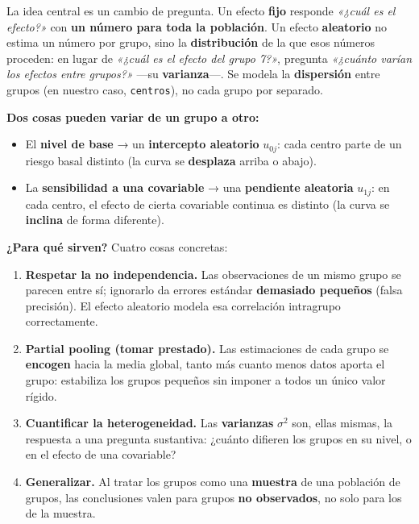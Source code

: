 \documentclass[
  letterpaper,
  DIV=11,
  numbers=noendperiod]{scrartcl}
\providecommand{\tightlist}{%
  \setlength{\itemsep}{0pt}\setlength{\parskip}{0pt}}\usepackage{longtable,booktabs,array}
\begin{document}
La idea central es un cambio de pregunta. Un efecto \textbf{fijo}
responde \emph{«¿cuál es el efecto?»} con \textbf{un número para toda la
población}. Un efecto \textbf{aleatorio} no estima un número por grupo,
sino la \textbf{distribución} de la que esos números proceden: en lugar
de \emph{«¿cuál es el efecto del grupo 7?»}, pregunta \emph{«¿cuánto
varían los efectos entre grupos?»} ---su \textbf{varianza}---. Se modela
la \textbf{dispersión} entre grupos (en nuestro caso, \texttt{centros}),
no cada grupo por separado.

\textbf{Dos cosas pueden variar de un grupo a otro:}

\begin{itemize}
\tightlist
\item
  El \textbf{nivel de base} → un \textbf{intercepto aleatorio}
  \(u_{0j}\): cada centro parte de un riesgo basal distinto (la curva se
  \textbf{desplaza} arriba o abajo).
\item
  La \textbf{sensibilidad a una covariable} → una \textbf{pendiente
  aleatoria} \(u_{1j}\): en cada centro, el efecto de cierta covariable
  continua es distinto (la curva se \textbf{inclina} de forma
  diferente).
\end{itemize}

\textbf{¿Para qué sirven?} Cuatro cosas concretas:

\begin{enumerate}
\def\labelenumi{\arabic{enumi}.}
\tightlist
\item
  \textbf{Respetar la no independencia.} Las observaciones de un mismo
  grupo se parecen entre sí; ignorarlo da errores estándar
  \textbf{demasiado pequeños} (falsa precisión). El efecto aleatorio
  modela esa correlación intragrupo correctamente.
\item
  \textbf{Partial pooling (tomar prestado).} Las estimaciones de cada
  grupo se \textbf{encogen} hacia la media global, tanto más cuanto
  menos datos aporta el grupo: estabiliza los grupos pequeños sin
  imponer a todos un único valor rígido.
\item
  \textbf{Cuantificar la heterogeneidad.} Las \textbf{varianzas}
  \(\sigma^2\) son, ellas mismas, la respuesta a una pregunta
  sustantiva: ¿cuánto difieren los grupos en su nivel, o en el efecto de
  una covariable?
\item
  \textbf{Generalizar.} Al tratar los grupos como una \textbf{muestra}
  de una población de grupos, las conclusiones valen para grupos
  \textbf{no observados}, no solo para los de la muestra.
\end{enumerate}
\end{document}
